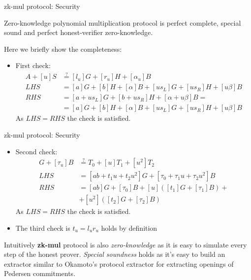 \documentclass{zkdl-presentation-template}
\begin{document}
\begin{frame}{zk-mul protocol: Security}
    \begin{theorem}
        Zero-knowledge polynomial multiplication protocol is perfect complete, special sound and perfect honest-verifier zero-knowledge.
    \end{theorem}
    Here we briefly show the completeness:
    \begin{itemize}
        \item First check: \begin{align*}
            A + [u]S &\stackrel{?}{=} [l_u]G + [r_u]H + [\alpha_u]B \\
            LHS &= [a]G + [b]H + [\alpha]B + [us_L]G + [us_R]H + [u\beta]B \\
            RHS &= [a+ u s_L]G + [b + u s_R]H + [\alpha + u \beta]B = \\
            &=[a]G + [b]H + [\alpha]B + [us_L]G + [us_R]H + [u\beta]B
        \end{align*}
        As $LHS = RHS$ the check is satisfied.
    \end{itemize}
\end{frame}

\begin{frame}{zk-mul protocol: Security}
    \begin{itemize}
        \item Second check: \begin{align*}
            [t_u]G + [\tau_u]B &\stackrel{?}{=} T_0 + [u]T_1 + [u^2]T_2 \\
            LHS &= [ab + t_1 u + t_2 u^2]G + [\tau_0 + \tau_1 u + \tau_2 u^2]B\\
            RHS &=[ab]G + [\tau_0]B + [u]([t_1]G + [\tau_1]B) + \\
            &+ [u^2]([t_2]G + [\tau_2]B)
        \end{align*}
        As $LHS = RHS$ the check is satisfied.
        \item The third check is $t_u = l_u r_u$ holds by definition
    \end{itemize}
    Intuitively \textbf{zk-mul} protocol is also \textit{zero-knowledge} as it is easy to simulate every step of the honest prover. \textit{Special soundness} holds as it's easy to build an extractor similar to Okamoto's protocol extractor for extracting openings of Pedersen commitments.
\end{frame}
\end{document}
